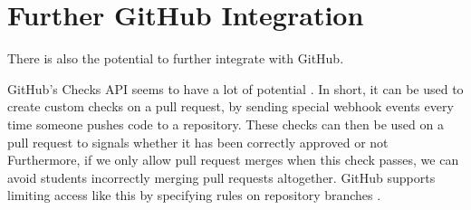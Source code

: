 \section{Further GitHub Integration}

There is also the potential to further integrate with GitHub.

GitHub's Checks API seems to have a lot of potential \cite{checks}.
In short, it can be used to create custom checks on a pull request, by sending special webhook events every time someone pushes code to a repository.
These checks can then be used on a pull request to signals whether it has been correctly approved or not
Furthermore, if we only allow pull request merges when this check passes, we can avoid students incorrectly merging pull requests altogether.
GitHub supports limiting access like this by specifying rules on repository branches \cite{branches}.
